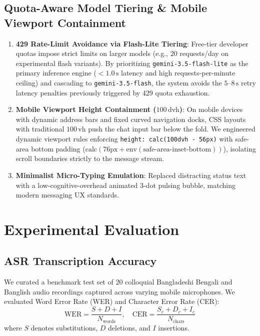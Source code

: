 \documentclass[conference]{IEEEtran}
\begin{document}
\subsection{Quota-Aware Model Tiering \& Mobile Viewport Containment}
\begin{enumerate}
    \item \textbf{429 Rate-Limit Avoidance via Flash-Lite Tiering}: Free-tier developer quotas impose strict limits on larger models (e.g., 20 requests/day on experimental flash variants). By prioritizing \texttt{gemini-3.5-flash-lite} as the primary inference engine ($<1.0\,\text{s}$ latency and high requests-per-minute ceiling) and cascading to \texttt{gemini-3.5-flash}, the system avoids the $5\text{--}8\,\text{s}$ retry latency penalties previously triggered by 429 quota exhaustion.
    \item \textbf{Mobile Viewport Height Containment ($100\,\text{dvh}$)}: On mobile devices with dynamic address bars and fixed curved navigation docks, CSS layouts with traditional $100\,\text{vh}$ push the chat input bar below the fold. We engineered dynamic viewport rules enforcing \texttt{height: calc(100dvh - 56px)} with safe-area bottom padding ($\text{calc}(76\text{px} + \text{env}(\text{safe-area-inset-bottom}))$), isolating scroll boundaries strictly to the message stream.
    \item \textbf{Minimalist Micro-Typing Emulation}: Replaced distracting status text with a low-cognitive-overhead animated 3-dot pulsing bubble, matching modern messaging UX standards.
\end{enumerate}

\section{Experimental Evaluation}

\subsection{ASR Transcription Accuracy}
We curated a benchmark test set of 20 colloquial Bangladeshi Bengali and Banglish audio recordings captured across varying mobile microphones. We evaluated Word Error Rate (WER) and Character Error Rate (CER):
\begin{equation}
\text{WER} = \frac{S + D + I}{N_{\text{words}}}, \quad \text{CER} = \frac{S_c + D_c + I_c}{N_{\text{chars}}}
\end{equation}
where $S$ denotes substitutions, $D$ deletions, and $I$ insertions.
\end{document}

